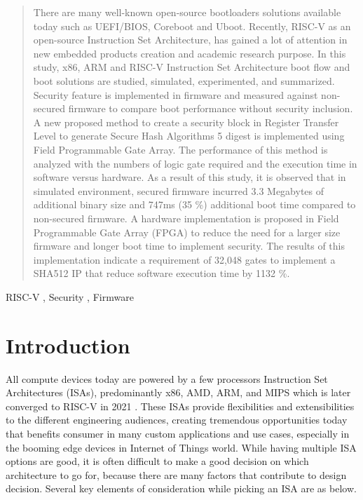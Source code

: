 \documentclass[a4paper,fleqn]{cas-dc}
\begin{document}
\begin{abstract} 
There are many well-known open-source bootloaders solutions available today such as UEFI/BIOS, Coreboot and Uboot.
Recently, RISC-V as an open-source Instruction Set Architecture, has gained a lot of attention in new embedded products
creation and academic research purpose. In this study, x86, ARM and RISC-V Instruction Set Architecture boot flow and
boot solutions are studied, simulated, experimented, and summarized. Security feature is implemented in firmware and
measured against non-secured firmware to compare boot performance without security inclusion. A new proposed method
to create a security block in Register Transfer Level to generate Secure Hash Algorithms 5 digest is implemented using Field
Programmable Gate Array. The performance of this method is analyzed with the numbers of logic gate required and the
execution time in software versus hardware. As a result of this study, it is observed that in simulated environment, secured
firmware incurred 3.3 Megabytes of additional binary size and 747ms (35 \%) additional boot time compared to non-secured
firmware. A hardware implementation is proposed in Field Programmable Gate Array (FPGA) to reduce the need for a larger
size firmware and longer boot time to implement security. The results of this implementation indicate a requirement of
32,048 gates to implement a SHA512 IP that reduce software execution time by 1132 \%.  
\end{abstract}


\begin{keywords}
RISC-V \sep 
Security \sep 
Firmware
\end{keywords}

\maketitle
\section{Introduction}
All compute devices today are powered by a few processors Instruction Set Architectures
(ISAs), predominantly x86, AMD, ARM, and MIPS which is later converged to RISC-V in
2021  \cite{R5:1}. These ISAs provide flexibilities and extensibilities to the
different engineering audiences, creating tremendous opportunities today that benefits
consumer in many custom applications and use cases, especially in the booming edge devices
in Internet of Things world. While having multiple ISA options are good, it is often difficult to
make a good decision on which architecture to go for, because there are many factors that
contribute to design decision. Several key elements of consideration while picking an ISA are as below.
\end{document}
